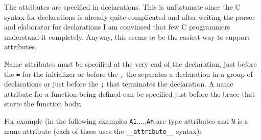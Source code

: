 \documentclass{article}
\def\t#1{{\tt #1}}
\begin{document}
 The attributes are specified in declarations. This is unfortunate since the C
syntax for declarations is already quite complicated and after writing the
parser and elaborator for declarations I am convinced that few C programmers
understand it completely. Anyway, this seems to be the easiest way to support
attributes. 

 Name attributes must be specified at the very end of the declaration, just
before the \t{=} for the initializer or before the \t{,} the separates a
declaration in a group of declarations or just before the \t{;} that
terminates the declaration. A name attribute for a function being defined can
be specified just before the brace that starts the function body.

 For example (in the following examples \t{A1},...,\t{An} are type attributes
and \t{N} is a name attribute (each of these uses the \t{\_\_attribute\_\_} syntax):

\end{document}
